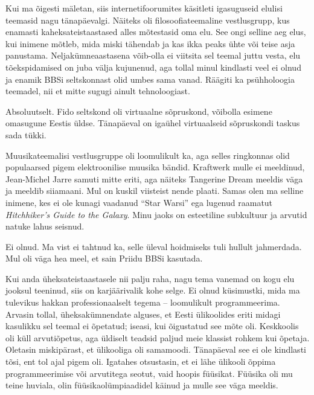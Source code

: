 
\label{sisu!inimeseks}Kui ma õigesti mäletan, siis internetifoorumites 
käsitleti igasuguseid elulisi teemasid nagu tänapäevalgi. 
Näiteks oli filosoofiateemaline vestlusgrupp, kus enamasti 
kaheksateistaastased alles mõtestasid oma elu. See ongi selline aeg 
elus, kui inimene mõtleb, mida miski tähendab ja kas ikka 
peaks ühte või teise asja panustama. Neljakümneaastasena 
võib-olla ei viitsita sel teemal juttu vesta, elu 
tõekspidamised on juba välja kujunenud, aga tollal minul kindlasti veel ei 
olnud ja enamik 
BBSi seltskonnast olid umbes sama vanad. Räägiti ka psühholoogia teemadel, nii 
et mitte sugugi ainult tehnoloogiast. 


Absoluutselt. Fido seltskond oli virtuaalne sõpruskond, võibolla esimene 
omasugune 
Eestis üldse. Tänapäeval on igaühel virtuaalseid sõpruskondi taskus sada tükki.


Muusikateemalisi vestlusgruppe oli loomulikult ka, aga selles ringkonnas olid 
populaarsed pigem elektroonilise muusika bändid.  
Kraftwerk mulle ei meeldinud, Jean-Michel Jarre samuti 
mitte eriti, aga näiteks Tangerine Dream meeldis väga ja meeldib
siiamaani. Mul on kuskil viisteist nende plaati. 
Samas olen ma selline inimene, kes ei ole kunagi vaadanud \enquote{Star Warsi} ega 
lugenud raamatut \emph{Hitchhiker's Guide to the Galaxy}. Minu jaoks on 
esteetiline subkultuur ja arvutid natuke lahus seisnud.


Ei olnud. Ma vist ei tahtnud ka, selle üleval hoidmiseks tuli hullult 
jahmerdada. 
Mul oli väga hea meel, et sain Priidu BBSi kasutada.


Kui anda üheksateistaastasele nii palju raha, nagu tema vanemad 
on kogu elu jooksul teeninud, siis on karjäärivalik kohe selge. Ei olnud 
küsimustki, mida ma 
tulevikus hakkan professionaalselt tegema -- loomulikult programmeerima. Arvasin 
tollal, 
üheksakümnendate alguses, et Eesti ülikoolides eriti midagi 
kasulikku sel teemal ei õpetatud; iseasi, kui õigustatud see mõte oli. 
Keskkoolis oli küll arvutiõpetus, aga üldiselt 
teadsid paljud meie klassist rohkem kui õpetaja. Oletasin
miskipärast, et ülikooliga oli samamoodi. Tänapäeval see ei ole kindlasti tõsi, 
ent tol ajal pigem oli. 
Igatahes otsustasin, et ei lähe ülikooli õppima 
programmeerimise või arvutitega seotut, vaid hoopis füüsikat. 
Füüsika oli mu teine huviala, olin 
füüsikaolümpiaadidel käinud ja mulle see väga meeldis. 

